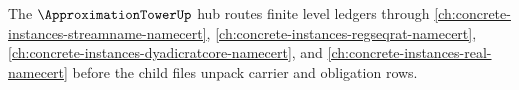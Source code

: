 The $\ApproximationTowerUp$ hub routes finite level ledgers through \autoref{ch:concrete-instances-streamname-namecert}, \autoref{ch:concrete-instances-regseqrat-namecert}, \autoref{ch:concrete-instances-dyadicratcore-namecert}, and \autoref{ch:concrete-instances-real-namecert} before the child files unpack carrier and obligation rows.




